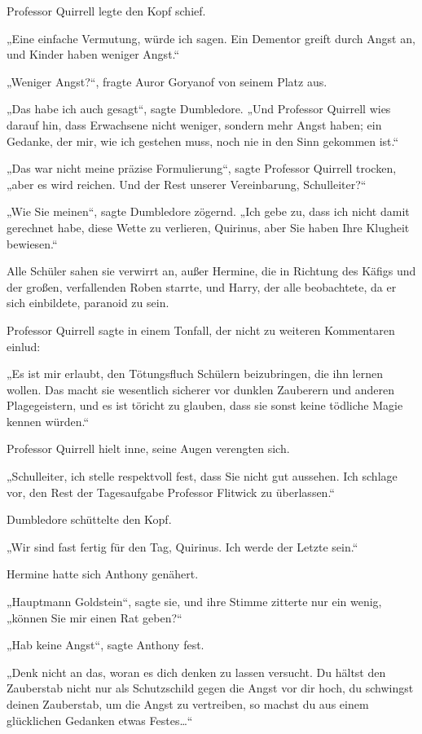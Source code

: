 {Professor Quirrell legte den Kopf schief.

„Eine einfache Vermutung, würde ich sagen. Ein Dementor greift durch Angst an, und Kinder haben weniger Angst.“

„Weniger Angst?“, fragte Auror Goryanof von seinem Platz aus.

„Das habe ich auch gesagt“, sagte Dumbledore. „Und Professor Quirrell wies darauf hin, dass Erwachsene nicht weniger, sondern mehr Angst haben; ein Gedanke, der mir, wie ich gestehen muss, noch nie in den Sinn gekommen ist.“

„Das war nicht meine präzise Formulierung“, sagte Professor Quirrell trocken, „aber es wird reichen. Und der Rest unserer Vereinbarung, Schulleiter?“

„Wie Sie meinen“, sagte Dumbledore zögernd. „Ich gebe zu, dass ich nicht damit gerechnet habe, diese Wette zu verlieren, Quirinus, aber Sie haben Ihre Klugheit bewiesen.“

Alle Schüler sahen sie verwirrt an, außer Hermine, die in Richtung des Käfigs und der großen, verfallenden Roben starrte, und Harry, der alle beobachtete, da er sich einbildete, paranoid zu sein.

Professor Quirrell sagte in einem Tonfall, der nicht zu weiteren Kommentaren einlud:

„Es ist mir erlaubt, den Tötungsfluch Schülern beizubringen, die ihn lernen wollen. Das macht sie wesentlich sicherer vor dunklen Zauberern und anderen Plagegeistern, und es ist töricht zu glauben, dass sie sonst keine tödliche Magie kennen würden.“

Professor Quirrell hielt inne, seine Augen verengten sich.

„Schulleiter, ich stelle respektvoll fest, dass Sie nicht gut aussehen. Ich schlage vor, den Rest der Tagesaufgabe Professor Flitwick zu überlassen.“

Dumbledore schüttelte den Kopf.

„Wir sind fast fertig für den Tag, Quirinus. Ich werde der Letzte sein.“

Hermine hatte sich Anthony genähert.

„Hauptmann Goldstein“, sagte sie, und ihre Stimme zitterte nur ein wenig, „können Sie mir einen Rat geben?“

„Hab keine Angst“, sagte Anthony fest.

„Denk nicht an das, woran es dich denken zu lassen versucht. Du hältst den Zauberstab nicht nur als Schutzschild gegen die Angst vor dir hoch, du schwingst deinen Zauberstab, um die Angst zu vertreiben, so machst du aus einem glücklichen Gedanken etwas Festes…“

}
